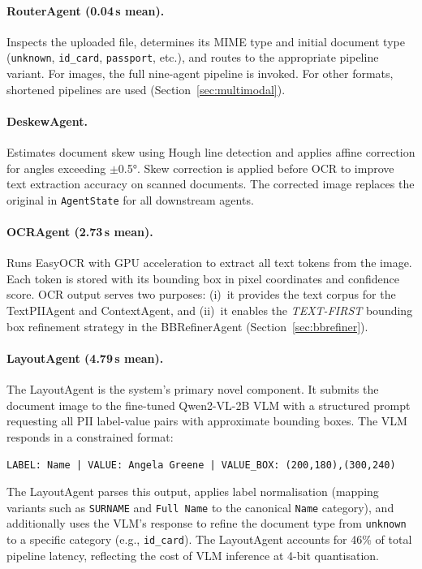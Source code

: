 \paragraph{RouterAgent (0.04\,s mean).}
Inspects the uploaded file, determines its MIME type
and initial document type (\texttt{unknown},
\texttt{id\_card}, \texttt{passport}, etc.),
and routes to the appropriate pipeline variant.
For images, the full nine-agent pipeline is invoked.
For other formats, shortened pipelines are used
(Section~\ref{sec:multimodal}).

\paragraph{DeskewAgent.}
Estimates document skew using Hough line detection
and applies affine correction for angles exceeding
$\pm$0.5°.
Skew correction is applied before OCR to improve text
extraction accuracy on scanned documents.
The corrected image replaces the original in
\texttt{AgentState} for all downstream agents.

\paragraph{OCRAgent (2.73\,s mean).}
Runs EasyOCR with GPU acceleration to extract
all text tokens from the image.
Each token is stored with its bounding box in pixel
coordinates and confidence score.
OCR output serves two purposes: (i)~it provides the
text corpus for the TextPIIAgent and ContextAgent,
and (ii)~it enables the \emph{TEXT-FIRST} bounding
box refinement strategy in the BBRefinerAgent
(Section~\ref{sec:bbrefiner}).

\paragraph{LayoutAgent (4.79\,s mean).}
The LayoutAgent is the system's primary novel
component.
It submits the document image to the fine-tuned
Qwen2-VL-2B VLM with a structured prompt requesting
all PII label-value pairs with approximate bounding
boxes.
The VLM responds in a constrained format:

\vspace{4pt}
\noindent\texttt{LABEL: Name | VALUE: Angela Greene |
VALUE\_BOX: (200,180),(300,240)}
\vspace{4pt}

The LayoutAgent parses this output, applies label
normalisation (mapping variants such as
\texttt{SURNAME} and \texttt{Full Name} to the
canonical \texttt{Name} category), and additionally
uses the VLM's response to refine the document type
from \texttt{unknown} to a specific category
(e.g., \texttt{id\_card}).
The LayoutAgent accounts for 46\% of total pipeline
latency, reflecting the cost of VLM inference at
4-bit quantisation.


